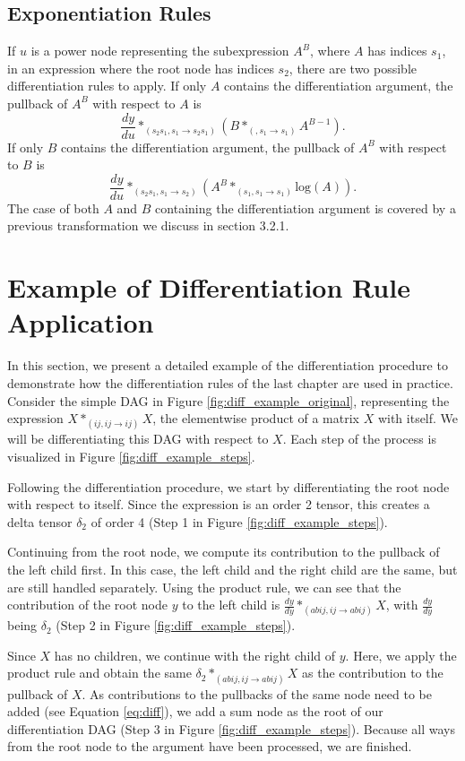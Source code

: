 \documentclass[12pt, a4paper]{report}
\begin{document}
\subsection{Exponentiation Rules}
If $u$ is a power node representing the subexpression $A^B$, where $A$ has indices $s_1$, in an expression where the root node has indices $s_2$, there are two possible differentiation rules to apply.
If only $A$ contains the differentiation argument, the pullback of $A^B$ with respect to $A$ is 
$$
\frac{dy}{du} *_{(s_2 s_1, s_1 \rightarrow s_2 s_1)} (B *_{(, s_1 \rightarrow s_1)} A^{B-1}).
$$
If only $B$ contains the differentiation argument, the pullback of $A^B$ with respect to $B$ is
$$
\frac{dy}{du} *_{(s_2 s_1, s_1 \rightarrow s_2)} (A^B *_{(s_1, s_1 \rightarrow s_1)} \text{log}(A)).
$$
The case of both $A$ and $B$ containing the differentiation argument is covered by a previous transformation we discuss in section 3.2.1.


\FloatBarrier
\section{Example of Differentiation Rule Application}
In this section, we present a detailed example of the differentiation procedure to demonstrate how the differentiation rules of the last chapter are used in practice.
Consider the simple DAG in Figure \ref{fig:diff_example_original}, representing the expression $X *_{(ij,ij \rightarrow ij)} X$, the elementwise product of a matrix $X$ with itself.
We will be differentiating this DAG with respect to $X$.
Each step of the process is visualized in Figure \ref{fig:diff_example_steps}.

Following the differentiation procedure, we start by differentiating the root node with respect to itself.
Since the expression is an order 2 tensor, this creates a delta tensor $\delta_2$ of order 4 (Step 1 in Figure \ref{fig:diff_example_steps}).

Continuing from the root node, we compute its contribution to the pullback of the left child first.
In this case, the left child and the right child are the same, but are still handled separately.
Using the product rule, we can see that the contribution of the root node $y$ to the left child is $\frac{dy}{dy} *_{(abij,ij \rightarrow abij)} X$, with $\frac{dy}{dy}$ being $\delta_2$ (Step 2 in Figure \ref{fig:diff_example_steps}).

Since $X$ has no children, we continue with the right child of $y$.
Here, we apply the product rule and obtain the same $\delta_2 *_{(abij,ij \rightarrow abij)} X$ as the contribution to the pullback of $X$.
As contributions to the pullbacks of the same node need to be added (see Equation \ref{eq:diff}), we add a sum node as the root of our differentiation DAG (Step 3 in Figure \ref{fig:diff_example_steps}).
Because all ways from the root node to the argument have been processed, we are finished.
\end{document}
